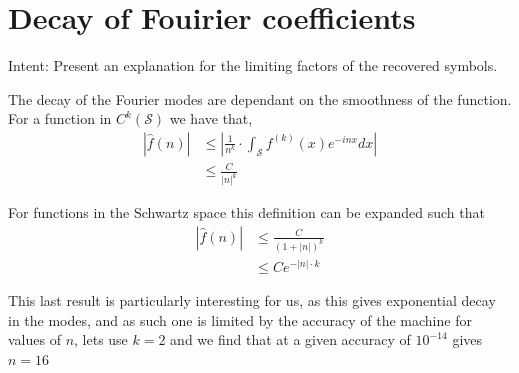 \section{Decay of Fouirier coefficients}
Intent: Present an explanation for the limiting factors of the recovered symbols. 

The decay of the Fourier modes are dependant on the smoothness of the function. For a function in $C^k(\mathcal{S})$ we have that,
\begin{align}
    |\hat{f}(n)| &\le |\frac{1}{n^k}\cdot \int_\mathcal{S} f^{(k)}(x) e^{-inx} dx| \\
    &\le \frac{C}{|n|^k}
\end{align}

For functions in the Schwartz space this definition can be expanded such that
\begin{align}
    |\hat{f}(n)| &\le \frac{C}{(1+|n|)^k} \\
    &\le C e^{-|n|\cdot k}
\end{align}

This last result is particularly interesting for us, as this gives exponential decay in the modes, and as such
one is limited by the accuracy of the machine for values of $n$, lets use $k=2$ and we find that at a given accuracy of $10^{-14}$ 
gives $n = 16$



